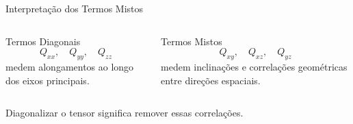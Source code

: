 \documentclass[aspectratio=169]{beamer}
\begin{document}
\begin{frame}{Interpretação dos Termos Mistos}

\begin{columns}


\begin{mybox}{Termos Diagonais}
\[
Q_{xx},
\quad
Q_{yy},
\quad
Q_{zz}
\]
medem alongamentos ao longo dos eixos principais.
\end{mybox}


\begin{alertblock}{Termos Mistos}
\[
Q_{xy},
\quad
Q_{xz},
\quad
Q_{yz}
\]
medem inclinações e correlações geométricas entre direções espaciais.
\end{alertblock}

\end{columns}

\vspace{0.5cm}

\begin{center}

\Large
Diagonalizar o tensor significa remover essas correlações.

\end{center}

\end{frame}

\end{document}
